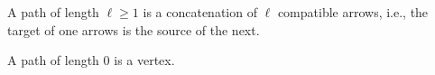 A path of length $\ell\geq 1$ is a concatenation of $\ell$ compatible arrows,
i.e., the target of one arrows is the source of the next.

A path of length $0$ is a vertex.
